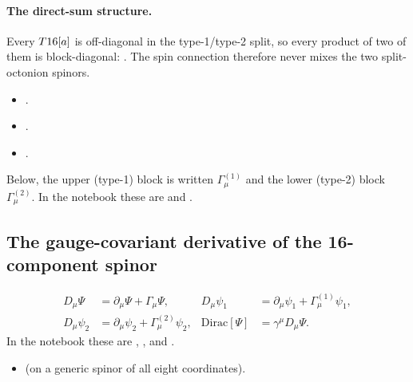 \paragraph{The direct-sum structure.} Every $T16[a]$ is off-diagonal in the type-1/type-2 split,
so every product of two of them is block-diagonal:
. The spin
connection therefore never mixes the two split-octonion spinors.
\begin{itemize}
  \item {} .
  \item {} .
  \item {} .
\end{itemize}
Below, the upper (type-1) block is written $\Gamma^{(1)}_\mu$ and the lower (type-2) block
$\Gamma^{(2)}_\mu$. In the notebook these are  and .

\subsection{The gauge-covariant derivative of the 16-component spinor}
\label{csc:dirac}\label{sec:9.8}

\begin{equation}
\begin{aligned}
  D_\mu\Psi&=\partial_\mu\Psi+\Gamma_\mu\Psi, &
  D_\mu\psi_1&=\partial_\mu\psi_1+\Gamma^{(1)}_\mu\psi_1,\\
  D_\mu\psi_2&=\partial_\mu\psi_2+\Gamma^{(2)}_\mu\psi_2, &
  \mathrm{Dirac}[\Psi]&=\gamma^\mu D_\mu\Psi .
\end{aligned}
\end{equation}
In the notebook these are ,
,  and
.
\begin{itemize}
  \item {} 
    (on a generic spinor of all eight coordinates).
\end{itemize}

